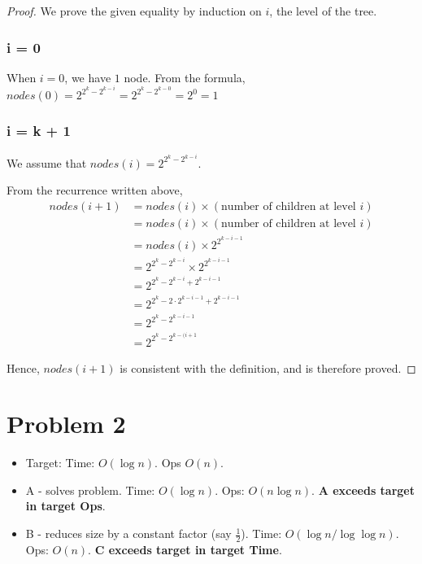 \documentclass{article}
\begin{document}
\begin{proof}
    We prove the given equality by induction on $i$, the level of the tree.

    \subsubsection{i = 0}

    When $i = 0$, we have $1$ node. From the formula,
    $nodes(0) = 2^{2^k - 2^{k - i}} = 2^{2^k - 2^{k - 0}} = 2^0 = 1$
    \subsubsection{i = k + 1}
    We assume that $nodes(i) = 2^{2^k - 2^{k - i}}$.

    From the recurrence written above,
    \begin{align*}
        nodes(i + 1) &= nodes(i) \times (\text{number of children at level $i$}) \\
                     &= nodes(i) \times (\text{number of children at level $i$}) \\
                     &= nodes(i) \times 2^{2^{k - i - 1}} \\
                     &= 2^{2^k - 2^{k - i}} \times 2^{2^{k - i - 1}} \\
                     &= 2^{2^k - 2^{k - i} + 2^{k - i - 1}} \\
                     &= 2^{2^k - 2 \cdot 2^{k - i - 1} + 2^{k - i - 1}} \\
                     &= 2^{2^k - 2^{k - i - 1}} \\
                     &= 2^{2^k - 2^{k - (i + 1}}
    \end{align*}

    Hence, $nodes(i + 1)$ is consistent with the definition, and is therefore
    proved.
\end{proof}

\section{Problem 2}
\begin{itemize}
    \item Target: Time: $O(\log n)$. Ops $O(n)$.
    \item A - solves problem. Time: $O(\log n)$. Ops: $O(n \log n)$.
        \textbf{A exceeds target in target Ops}.
    \item B - reduces size by a constant factor (say $\frac{1}{2}$).
        Time: $O(\log n / \log \log n)$. Ops: $O(n)$.
        \textbf{C exceeds target in target Time}.
\end{itemize}
\end{document}

